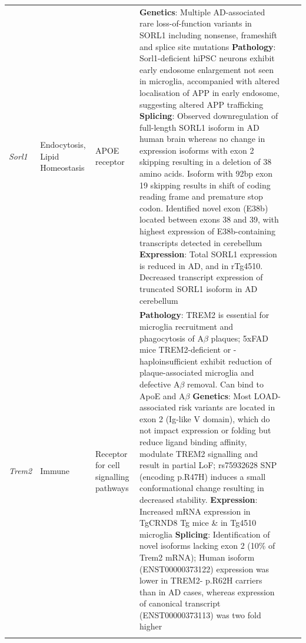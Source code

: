 \begin{changemargin}{1.5cm}
\begin{landscape}
\begin{longtable}[c]{p{1cm}p{2cm}p{4cm}p{16cm}p{1cm}p{1cm}}
			\centering \textit{Sorl1} &
			\centering Endocytosis, Lipid Homeostasis  &
			\centering APOE receptor &
			\tabitem \textbf{Genetics}: Multiple AD-associated rare loss-of-function variants in SORL1 including nonsense, frameshift and splice site mutations \cite{Fernandez2016} \newline
			\tabitem \textbf{Pathology}: Sorl1-deficient hiPSC neurons exhibit early endosome enlargement not seen in microglia, accompanied with altered localisation of APP in early endosome, suggesting altered APP trafficking \cite{Knupp2020}\newline
			\tabitem \textbf{Splicing}: Observed downregulation of full-length SORL1 isoform in AD human brain whereas no change in expression isoforms with exon 2 skipping resulting in a deletion of 38 amino acids. Isoform with 92bp exon 19 skipping results in shift of coding reading frame and premature stop codon\cite{Grear2009}. Identified novel exon (E38b) located between exons 38 and 39, with highest expression of E38b-containing transcripts detected in cerebellum\cite{Monti2021} \newline
			\tabitem \textbf{Expression}: Total SORL1 expression is reduced in AD, and in rTg4510\cite{Sobue2021}. Decreased transcript expression of truncated SORL1 isoform in AD cerebellum \cite{Monti2021}\\
			\hdashline[0.5pt/5pt]	
						
			\centering \textit{Trem2} &
			\centering Immune  &
			\centering Receptor for cell signalling pathways\newline &
			\tabitem \textbf{Pathology}: TREM2 is essential for microglia recruitment and phagocytosis of A$\beta$ plaques; 5xFAD mice TREM2-deficient or -haploinsufficient exhibit reduction of plaque-associated microglia and defective A$\beta$ removal\cite{Wang2015a}. Can bind to ApoE and A$\beta$ \newline
			\tabitem \textbf{Genetics}: Most LOAD-associated risk variants are located in exon 2 (Ig-like V domain), which do not impact expression or folding but reduce ligand binding affinity\cite{Kober2016}, modulate TREM2 signalling and result in partial LoF\cite{Guerreiro2013a};  rs75932628 SNP (encoding p.R47H) induces a small conformational change resulting in decreased stability\cite{Kober2016}. \newline
			\tabitem \textbf{Expression}: Increased mRNA expression in TgCRND8 Tg mice\cite{Guerreiro2013a} \& in Tg4510 microglia \cite{Sobue2021} \newline
			\tabitem \textbf{Splicing}: Identification of novel isoforms lacking exon 2 (10\% of Trem2 mRNA)\cite{Kiianitsa2021}; Human isoform (ENST00000373122) expression was lower in TREM2- p.R62H carriers than in AD cases, whereas expression of canonical transcript (ENST00000373113) was two fold higher\cite{Del-Aguila2019} \\
			\hdashline[0.5pt/5pt]
						

\end{longtable}
\end{landscape}
\end{changemargin}
